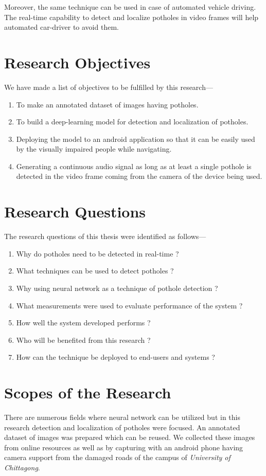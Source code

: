     Moreover, the same technique can be used in case of automated vehicle driving.
    The real-time capability to detect and localize potholes in video frames will help automated car-driver to avoid them.
    
\section{Research Objectives}
    We have made a list of objectives to be fulfilled by this research---
    \begin{enumerate}
        \item{To make an annotated dataset of images having potholes.}
        \item{To build a deep-learning model for detection and localization of potholes.}
        \item{Deploying the model to an android application so that it can be easily used by the visually impaired people while navigating.}
        \item{Generating a continuous audio signal as long as at least a single pothole is detected in the video frame coming from the camera of the device being used.}
    \end{enumerate}
    
\section{Research Questions}
    The research questions of this thesis were identified as follows---
    \begin{enumerate}
        \item{Why do potholes need to be detected in real-time ?}
        \item{What techniques can be used to detect potholes ?}
        \item{Why using neural network as a technique of pothole detection ?}
        \item{What measurements were used to evaluate performance of the system ?}
        \item{How well the system developed performs ?}
        \item{Who will be benefited from this research ?}
        \item{How can the technique be deployed to end-users and systems ?}
    \end{enumerate}
    
\section{Scopes of the Research}
    There are numerous fields where neural network can be utilized but in this research detection and localization of potholes were focused. An annotated dataset of images was prepared which can be reused. We collected these images from online resources as well as by capturing with an android phone having camera support from the damaged roads of the campus of {\itshape University of Chittagong}.
    
